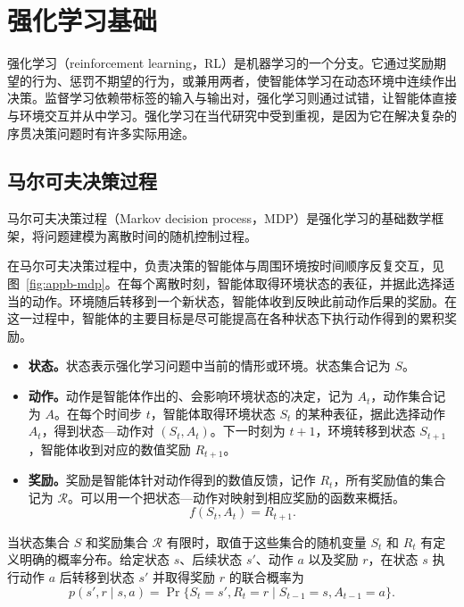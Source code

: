 \chapter{强化学习基础}
\label{app:reinforcement-learning}
\chaptercredit{}

强化学习（reinforcement learning，RL）是机器学习的一个分支。它通过奖励期望的行为、惩罚不期望的行为，或兼用两者，使智能体学习在动态环境中连续作出决策。监督学习依赖带标签的输入与输出对，强化学习则通过试错，让智能体直接与环境交互并从中学习。强化学习在当代研究中受到重视，是因为它在解决复杂的序贯决策问题时有许多实际用途。

\section{马尔可夫决策过程}
\label{sec:appb-mdp}
马尔可夫决策过程（Markov decision process，MDP）是强化学习的基础数学框架，将问题建模为离散时间的随机控制过程。

在马尔可夫决策过程中，负责决策的智能体与周围环境按时间顺序反复交互，见图~\ref{fig:appb-mdp}。在每个离散时刻，智能体取得环境状态的表征，并据此选择适当的动作。环境随后转移到一个新状态，智能体收到反映此前动作后果的奖励。在这一过程中，智能体的主要目标是尽可能提高在各种状态下执行动作得到的累积奖励。


\begin{itemize}
\item \textbf{状态。}状态表示强化学习问题中当前的情形或环境。状态集合记为 $S$。
\item \textbf{动作。}动作是智能体作出的、会影响环境状态的决定，记为 $A_t$，动作集合记为 $A$。在每个时间步 $t$，智能体取得环境状态 $S_t$ 的某种表征，据此选择动作 $A_t$，得到状态—动作对 $(S_t,A_t)$。下一时刻为 $t+1$，环境转移到状态 $S_{t+1}$，智能体收到对应的数值奖励 $R_{t+1}$。
\item \textbf{奖励。}奖励是智能体针对动作得到的数值反馈，记作 $R_t$，所有奖励值的集合记为 $\mathcal{R}$。可以用一个把状态—动作对映射到相应奖励的函数来概括。
\begin{equation}
f(S_t,A_t)=R_{t+1}.
\label{eq:appb-reward}
\end{equation}
\end{itemize}

当状态集合 $S$ 和奖励集合 $\mathcal{R}$ 有限时，取值于这些集合的随机变量 $S_t$ 和 $R_t$ 有定义明确的概率分布。给定状态 $s$、后续状态 $s'$、动作 $a$ 以及奖励 $r$，在状态 $s$ 执行动作 $a$ 后转移到状态 $s'$ 并取得奖励 $r$ 的联合概率为
\begin{equation}
p(s',r\mid s,a)
=\Pr\{S_t=s',R_t=r\mid S_{t-1}=s,A_{t-1}=a\}.
\label{eq:appb-transition}
\end{equation}

